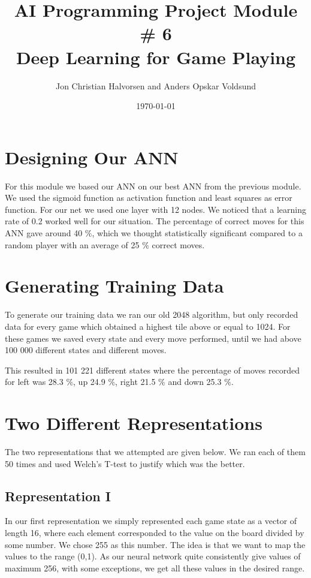 \documentclass[11pt,a4paper]{article}
\author{Jon Christian Halvorsen and Anders Opskar Voldsund}
\title{ \textbf{ AI Programming Project Module \# 6 }  \\
Deep Learning for Game Playing }
\date{\today}
\begin{document}
\maketitle

\section*{Designing Our ANN}
For this module we based our ANN on our best ANN from the previous module. We used the sigmoid function as activation function and least squares as error function. For our net we used one layer with 12 nodes. We noticed that a learning rate of 0.2 worked well for our situation. The percentage of correct moves for this ANN gave around 40 $\%$, which we thought statistically significant compared to a random player with an average of 25 $\%$ correct moves.

\section*{Generating Training Data}
To generate our training data we ran our old 2048 algorithm, but only recorded data for every game which obtained a highest tile above or equal to 1024. For these games we saved every state and every move performed, until we had above 100 000 different states and different moves.

This resulted in 101 221 different states where the percentage of moves recorded for left was 28.3 $\%$, up 24.9 $\%$, right 21.5 $\%$ and down 25.3 $\%$.  

\section*{Two Different Representations}
The two representations that we attempted are given below. We ran each of them 50 times and used Welch's T-test to justify which was the better.

\subsection*{Representation I}
In our first representation we simply represented each game state as a vector of length 16, where each element corresponded to the value on the board divided by some number. We chose 255 as this number. The idea is that we want to map the values to the range (0,1). As our neural network quite consistently give values of maximum 256, with some exceptions, we get all these values in the desired range.
\end{document}
